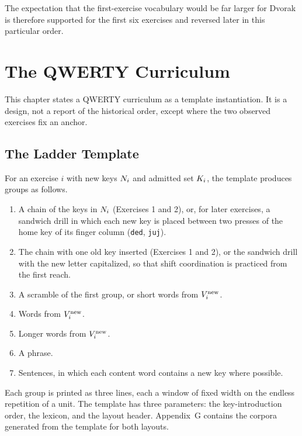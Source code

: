 The expectation that the first-exercise vocabulary would be far larger for Dvorak is therefore supported for the first six exercises and reversed later in this particular order.

\chapter{The QWERTY Curriculum}
\label{ch:qwerty}

This chapter states a QWERTY curriculum as a template instantiation. It is a design, not a report of the historical order, except where the two observed exercises fix an anchor. 

\section{The Ladder Template}

For an exercise $i$ with new keys $N_i$ and admitted set $K_i$, the template produces groups as follows.

\begin{enumerate}[label=\textbf{G\arabic*.}]
\item A chain of the keys in $N_i$ (Exercises 1 and 2), or, for later exercises, a sandwich drill in which each new key is placed between two presses of the home key of its finger column (\texttt{ded}, \texttt{juj}).
\item The chain with one old key inserted (Exercises 1 and 2), or the sandwich drill with the new letter capitalized, so that shift coordination is practiced from the first reach.
\item A scramble of the first group, or short words from $V_i^{\mathrm{new}}$.
\item Words from $V_i^{\mathrm{new}}$.
\item Longer words from $V_i^{\mathrm{new}}$.
\item A phrase.
\item[\textbf{G7+.}] Sentences, in which each content word contains a new key where possible.
\end{enumerate}

Each group is printed as three lines, each a window of fixed width on the endless repetition of a unit. The template has three parameters: the key-introduction order, the lexicon, and the layout header. Appendix~G contains the corpora generated from the template for both layouts.


